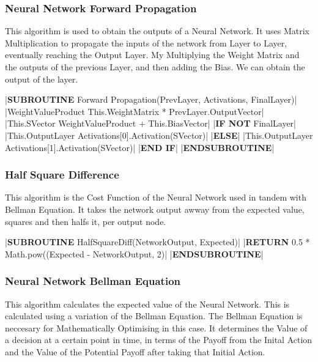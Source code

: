 \begin{flushleft}
            \subsubsection{Neural Network Forward Propagation}
                This algorithm is used to obtain the outputs of a Neural Network. It uses Matrix Multiplication to propagate the inputs
                of the network from Layer to Layer, eventually reaching the Output Layer. My Multiplying the Weight Matrix and the outputs
                of the previous Layer, and then adding the Bias. We can obtain the output of the layer.

                \vspace{0.2cm}
                \begin{pseudocode}
|\textbf{SUBROUTINE} Forward Propagation(PrevLayer, Activations, FinalLayer)|
    |WeightValueProduct \leftarrow This.WeightMatrix * PrevLayer.OutputVector|
    |This.SVector \leftarrow WeightValueProduct + This.BiasVector|
    |\textbf{IF NOT} FinalLayer|
        |This.OutputLayer \leftarrow Activations[0].Activation(SVector)|
    |\textbf{ELSE}|
        |This.OutputLayer \leftarrow Activations[1].Activation(SVector)|
    |\textbf{END IF}| 
|\textbf{ENDSUBROUTINE}|
                \end{pseudocode}

                \vspace{0.5cm}
            \subsubsection{Half Square Difference}  
                This algorithm is the Cost Function of the Neural Network used in tandem with Bellman Equation. It takes the network output
                awway from the expected value, squares and then halfs it, per output node.

                \begin{pseudocode}
|\textbf{SUBROUTINE} HalfSquareDiff(NetworkOutput, Expected)|  
    |\textbf{RETURN} 0.5 * Math.pow((Expected - NetworkOutput, 2)|
|\textbf{ENDSUBROUTINE}|
                \end{pseudocode}

            \subsubsection{Neural Network Bellman Equation}
                This algorithm calculates the expected value of the Neural Network. This is calculated using a variation of the Bellman Equation.
                The Bellman Equation is neccesary for Mathematically Optimising in this case. It determines the Value of a decision at a certain 
                point in time, in terms of the Payoff from the Inital Action and the Value of the Potential Payoff after taking that Initial
                Action. 
                

\end{flushleft}
